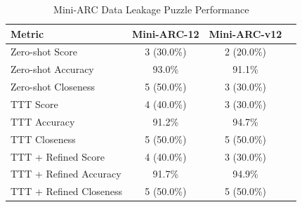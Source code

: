 \documentclass[10pt,twocolumn]{article}
\begin{document}
\begin{table}[h]
  \centering
  \caption{Mini-ARC Data Leakage Puzzle Performance}
  \begin{tabular}{lccc}
    \toprule
    \textbf{Metric} & \textbf{Mini-ARC-12} &
    \textbf{Mini-ARC-v12} \\
    \midrule
    Zero-shot Score & 3 (30.0\%) & 2 (20.0\%)  \\
    Zero-shot Accuracy & 93.0\% & 91.1\%  \\
    Zero-shot Closeness & 5 (50.0\%) & 3 (30.0\%)  \\
    \addlinespace
    \cmidrule{1-3}
    TTT Score & 4 (40.0\%) & 3 (30.0\%)  \\
    TTT Accuracy & 91.2\% & 94.7\%  \\
    TTT Closeness & 5 (50.0\%) & 5 (50.0\%) \\
    \addlinespace
    \cmidrule{1-3}
    TTT + Refined Score  & 4 (40.0\%) & 3 (30.0\%)  \\
    TTT + Refined Accuracy  & 91.7\% & 94.9\%  \\
    TTT + Refined Closeness  & 5 (50.0\%) & 5 (50.0\%)  \\
    \bottomrule
  \end{tabular}
  \label{tab:leakage-performance}
\end{table}
\end{document}
